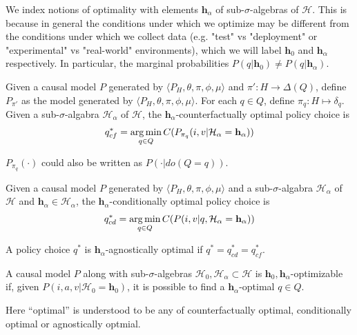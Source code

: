 We index notions of optimality with elements $\mathbf{h}_\alpha$ of sub-$\sigma$-algebras of $\mathcal{H}$. This is because in general the conditions under which we optimize may be different from the conditions under which we collect data (e.g. "test" vs "deployment" or "experimental" vs "real-world" environments), which we will label $\mathbf{h}_0$ and $\mathbf{h}_\alpha$ respectively. In particular, the marginal probabilities $P(q|\mathbf{h}_0)\neq P(q|\mathbf{h}_\alpha)$.

\begin{definition}
Given a causal model $P$ generated by $\langle P_H,\theta,\pi,\phi,\mu\rangle$ and $\pi':H\to \Delta(Q)$, define $P_{\pi'}$ as the model generated by $\langle P_H,\theta,\pi,\phi,\mu\rangle$. For each $q\in Q$, define $\pi_q:H\mapsto \delta_q$. Given a sub-$\sigma$-algabra $\mathcal{H}_\alpha$ of $\mathcal{H}$, the $\mathbf{h}_\alpha$-counterfactually optimal policy choice is
\begin{align}
    q^*_{cf}=\operatorname*{arg\,min}_{q\in Q}C(P_{\pi_q}(i,v|\mathcal{H}_\alpha=\mathbf{h}_\alpha))
\end{align}
\end{definition}

\begin{remark}
$P_{\pi_q}(\cdot)$ could also be written as $P(\cdot|do(Q=q))$.
\end{remark}

\begin{definition}
Given a causal model $P$ generated by $\langle P_H,\theta,\pi,\phi,\mu\rangle$ and a sub-$\sigma$-algabra $\mathcal{H}_\alpha$ of $\mathcal{H}$ and $\mathbf{h}_\alpha \in \mathcal{H}_\alpha$, the $\mathbf{h}_\alpha$-conditionally optimal policy choice is
\begin{align}
    q^*_{cd} = \operatorname*{arg\,min}_{q\in Q} C(P(i,v|q,\mathcal{H}_\alpha=\mathbf{h}_\alpha))
\end{align}
\end{definition}

\begin{definition}
A policy choice $q^*$ is $\mathbf{h}_\alpha$-agnostically optimal if $q^*=q^*_{cd}=q^*_{cf}$.
\end{definition}

\begin{definition}
A causal model $P$ along with sub-$\sigma$-algebras $\mathcal{H}_0,\mathcal{H}_\alpha\subset \mathcal{H}$ is $\mathbf{h}_0,\mathbf{h}_\alpha$-optimizable if, given  $P(i,a,v|\mathcal{H}_0=\mathbf{h}_0)$, it is possible to find a $\mathbf{h}_\alpha$-optimal $q\in Q$.

Here ``optimal'' is understood to be any of counterfactually optimal, conditionally optimal or agnostically optmial.
\end{definition}

